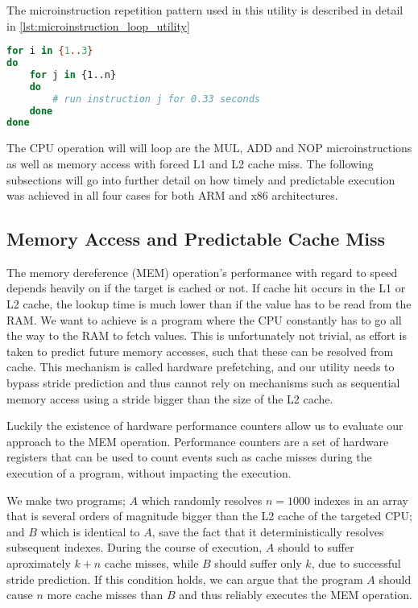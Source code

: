 The microinstruction repetition pattern used in this utility is described in detail in \autoref{lst:microinstruction_loop_utility}

\begin{lstlisting}[language=BASH, caption={Mapping execution to the time domain: Microinstruction loop utility.}, label={lst:microinstruction_loop_utility}]
for i in {1..3}
do
	for j in {1..n}
	do
		# run instruction j for 0.33 seconds
	done
done
\end{lstlisting}

The CPU operation will will loop are the MUL, ADD and NOP microinstructions as well as memory access with forced L1 and L2 cache miss. 
The following subsections will go into further detail on how timely and predictable execution was achieved in all four cases for both ARM and x86 architectures.

\subsection{Memory Access and Predictable Cache Miss}
\label{subsec:MEM_operation}

The memory dereference (MEM) operation's performance with regard to speed depends heavily on if the target is cached or not. 
If cache hit occurs in the L1 or L2 cache, the lookup time is much lower than if the value has to be read from the RAM.
We want to achieve is a program where the CPU constantly has to go all the way to the RAM to fetch values.
This is unfortunately not trivial, as effort is taken to predict future memory accesses, such that these can be resolved from cache.
This mechanism is called hardware prefetching, and our utility needs to bypass stride prediction and thus cannot rely on mechanisms such as sequential memory access using a stride bigger than the size of the L2 cache.

Luckily the existence of hardware performance counters allow us to evaluate our approach to the MEM operation. Performance counters are a set of hardware registers that can be used to count events such as cache misses during the execution of a program, without impacting the execution\cite{url:perf_wiki}.

We make two programs; \(A\) which randomly resolves \(n = 1000\) indexes in an array that is several orders of magnitude bigger than the L2 cache of the targeted CPU; and \(B\) which is identical to \(A\), save the fact that it deterministically resolves subsequent indexes.
During the course of execution, \(A\) should to suffer aproximately \(k+n\) cache misses, while \(B\) should suffer only \(k\), due to successful stride prediction. 
If this condition holds, we can argue that the program \(A\) should cause \(n\) more cache misses than \(B\) and thus reliably executes the MEM operation. 

